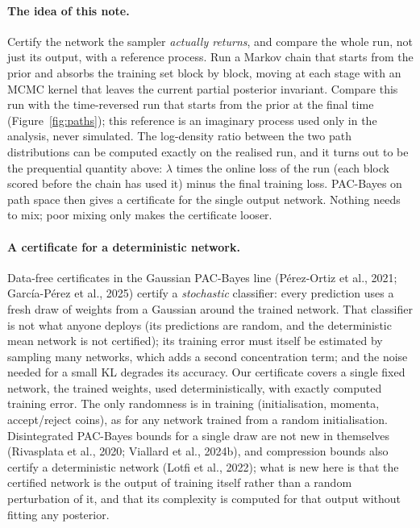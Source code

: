 \documentclass[11pt]{article}
\theoremstyle{definition}
\theoremstyle{remark}
\begin{document}
\paragraph{The idea of this note.} Certify the network the sampler \emph{actually returns}, and compare the whole run,
not just its output, with a reference process. Run a Markov chain that starts from the prior and absorbs the training
set block by block, moving at each stage with an MCMC kernel that leaves the current partial posterior invariant.
Compare this run with the time-reversed run that starts from the prior at the final time (Figure~\ref{fig:paths}); this
reference is an imaginary process used only in the analysis, never simulated. The
log-density ratio between the two path distributions can be computed exactly on the realised run, and it turns out to
be the prequential quantity above: $\lambda$ times the online loss of the run (each block scored before the chain has
used it) minus the final training loss. PAC-Bayes on path space then gives a certificate for the single output network.
Nothing needs to mix; poor mixing only makes the certificate looser.

\paragraph{A certificate for a deterministic network.} Data-free certificates in the Gaussian PAC-Bayes line
(P\'erez-Ortiz et al., 2021; Garc\'ia-P\'erez et al., 2025) certify a \emph{stochastic} classifier: every prediction uses a
fresh draw of weights from a Gaussian around the trained network. That classifier is not what anyone deploys (its
predictions are random, and the deterministic mean network is not certified); its training error must itself be estimated
by sampling many networks, which adds a second concentration term; and the noise needed for a small KL degrades its
accuracy. Our certificate covers a single fixed network, the trained weights, used deterministically, with exactly
computed training error. The only randomness is in training (initialisation, momenta, accept/reject coins), as for any
network trained from a random initialisation. Disintegrated PAC-Bayes bounds for a single draw are not new in themselves
(Rivasplata et al., 2020; Viallard et al., 2024b), and compression bounds also certify a deterministic network (Lotfi et
al., 2022); what is new here is that the certified network is the output of training itself rather than a random
perturbation of it, and that its complexity is computed for that output without fitting any posterior.
\end{document}

